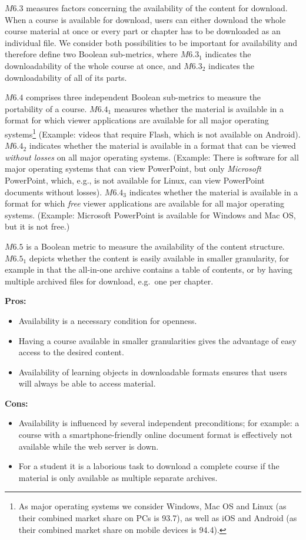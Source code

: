 \documentclass{sig-alternate}
\theoremstyle{definition}
\begin{document}
$M6.3$ measures factors concerning the availability of the content for download.
When a course is available for download, users can either download the whole course material at once or every part or chapter has to be downloaded as an individual file.
We consider both possibilities to be important for availability and therefore define two Boolean sub-metrics, where $M6.3_1$ indicates the downloadability of the whole course at once, and $M6.3_2$ indicates the downloadability of all of its parts.


$M6.4$ comprises three independent Boolean sub-metrics to measure the portability of a course.
$M6.4_1$ measures whether the material is available in a format for which viewer applications are available for all major operating systems\footnote{As major operating systems we consider Windows, Mac OS and Linux (as their combined market share on PCs is 93.7), as well as iOS and Android (as their combined market share on mobile devices is 94.4).}
(Example: videos that require Flash, which is not available on Android).
$M6.4_2$ indicates whether the material is available in a format that can be viewed \emph{without losses} on all major operating systems.
(Example: There is software for all major operating systems that can view PowerPoint, but only \emph{Microsoft} PowerPoint, which, e.g., is not available for Linux, can view PowerPoint documents without losses).
$M6.4_3$ indicates whether the material is available in a format for which \emph{free} viewer applications are available for all major operating systems.
(Example: Microsoft PowerPoint is available for Windows and Mac OS, but it is not free.)


$M6.5$ is a Boolean metric to measure the availability of the content structure.
$M6.5_1$ depicts whether the content is easily available in smaller granularity, for example in that the all-in-one archive contains a table of contents, or by having multiple archived files for download, e.g.\ one per chapter.


\noindent\textbf{Pros:}
\begin{itemize}
\item Availability is a necessary condition for openness.
\item Having a course available in smaller granularities gives the advantage of easy access to the desired content.
\item Availability of learning objects in downloadable formats ensures that users will always be able to access material.
\end{itemize}
\noindent\textbf{Cons:}
\begin{itemize}
\item Availability is influenced by several independent preconditions; for example: a course with a smartphone-friendly online document format is effectively not available while the web server is down.
\item For a student it is a laborious task to download a complete course if the material is only available as multiple separate archives.
\end{itemize}
\end{document}
